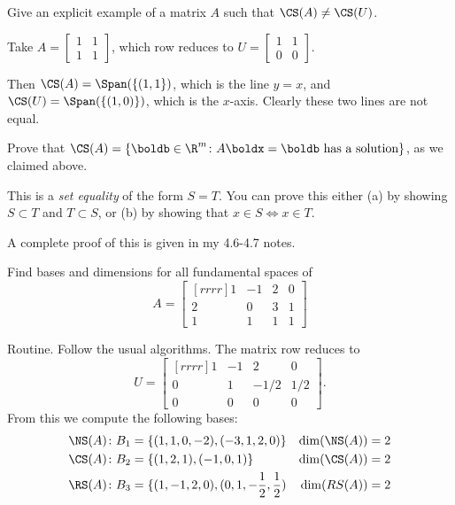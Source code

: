 \bb
\ii Give an explicit example of a matrix $A$ such that $\CS(A)\ne \CS(U)$. 
\\
\begin{solution}
Take $A=\begin{bmatrix}1&1\\1&1 \end{bmatrix}$, which row reduces to $U=\begin{bmatrix} 1&1\\0&0 \end{bmatrix}$. 

Then $\CS(A)=\Span(\{(1,1\})$, which is the line $y=x$, and $\CS(U)=\Span(\{(1,0)\})$, which is the $x$-axis. Clearly these two lines are not equal. 
\end{solution}
\ii Prove that $\CS(A)=\{\boldb\in\R^m\colon A\boldx=\boldb \text{ has a solution}\}$, as we claimed above.

This is a {\em set equality} of the form $S=T$. You can prove this either (a) by showing $S\subset T$ and $T\subset S$, or (b) by showing that $x\in S \Leftrightarrow x\in T$. 
\\
\begin{solution}
A complete proof of this is given in my 4.6-4.7 notes. 
\end{solution}
\ii Find bases and dimensions for all fundamental spaces of 
\[
A=\begin{bmatrix}[rrrr] 
1&-1&2&0\\
2&0&3&1\\
1&1&1&1
\end{bmatrix}
\]
\begin{solution}
Routine. Follow the usual algorithms. The matrix row reduces to 
\[
U=\begin{bmatrix}[rrrr]
1&-1&2&0\\ 0&1&-1/2&1/2\\ 0&0&0&0
\end{bmatrix}.
\]
From this we compute the following bases:
\begin{align*}
\NS(A)\colon B_1&=\{(1,1,0,-2), (-3,1,2,0) \} & \dim(\NS(A))&=2\\
\CS(A)\colon B_2&=\{ (1,2,1), (-1,0,1) \} & \dim(\CS(A))&=2\\
\RS(A)\colon B_3&=\{ (1,-1,2,0), (0,1,-\frac{1}{2},\frac{1}{2}) & \dim(RS(A))&=2 
\end{align*}
\end{solution}

